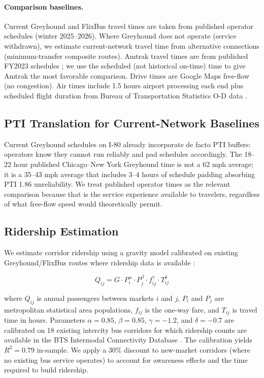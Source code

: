\paragraph{Comparison baselines.} Current Greyhound and FlixBus travel times are taken from published operator schedules (winter 2025--2026). Where Greyhound does not operate (service withdrawn), we estimate current-network travel time from alternative connections (minimum-transfer composite routes). Amtrak travel times are from published FY2023 schedules \citep{Amtrak2023}; we use the scheduled (not historical on-time) time to give Amtrak the most favorable comparison. Drive times are Google Maps free-flow (no congestion). Air times include 1.5 hours airport processing each end plus scheduled flight duration from Bureau of Transportation Statistics O-D data \citep{BTS_intermodal2023}.

\subsection{PTI Translation for Current-Network Baselines}

Current Greyhound schedules on I-80 already incorporate de facto PTI buffers: operators know they cannot run reliably and pad schedules accordingly. The 18--22 hour published Chicago--New York Greyhound time is not a 62 mph average; it is a 35--43 mph average that includes 3--4 hours of schedule padding absorbing PTI 1.86 unreliability. We treat published operator times as the relevant comparison because that is the service experience available to travelers, regardless of what free-flow speed would theoretically permit.

\subsection{Ridership Estimation}

We estimate corridor ridership using a gravity model calibrated on existing Greyhound/FlixBus routes where ridership data is available \citep{BTS_intermodal2023}:

\begin{equation}
  Q_{ij} = G \cdot P_i^\alpha \cdot P_j^\beta \cdot f_{ij}^\gamma \cdot T_{ij}^\delta
  \label{eq:gravity}
\end{equation}

where $Q_{ij}$ is annual passengers between markets $i$ and $j$, $P_i$ and $P_j$ are metropolitan statistical area populations, $f_{ij}$ is the one-way fare, and $T_{ij}$ is travel time in hours. Parameters $\alpha = 0.85$, $\beta = 0.85$, $\gamma = -1.2$, and $\delta = -0.7$ are calibrated on 18 existing intercity bus corridors for which ridership counts are available in the BTS Intermodal Connectivity Database \citep{BTS_intermodal2023}. The calibration yields $R^2 = 0.79$ in-sample. We apply a 30\% discount to new-market corridors (where no existing bus service operates) to account for awareness effects and the time required to build ridership.

